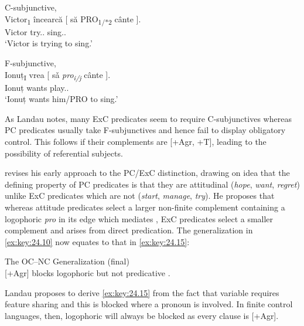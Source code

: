 \documentclass[output=paper]{langsci/langscibook}
\begin{document}
\ea\label{ex:key:24.13} C-subjunctive,  \parencite[6]{Alboiu2007}\\
	\gll Victor\textsubscript{1}  încearcă   [ să          PRO\textsubscript{1/*2} cânte ].\\
        Victor    try.\Prs.\Tsg{} {} \Sbjv{} {}    sing.\Sbjv.\Tsg{}\\
	\glt ‘Victor is trying to sing.’
\z

\ea\label{ex:key:24.14} F-subjunctive, \\
	\gll Ionuț\textsubscript{I} vrea  [ sǎ     \emph{pro\textsubscript{i/j}}\textsubscript{}  cânte ].\\
            Ionuț    wants {}  \Sbjv{} {} play.\Sbjv{}.\Tsg{}\\
	\glt ‘Ionuț wants him/PRO to sing.’
\z

As Landau notes, many \gls{ExC} predicates seem
to require C-subjunctives whereas \gls{PC}
predicates usually take F-subjunctives and hence fail to display obligatory
control. This follows if their complements are [+Agr, +T], leading to the
possibility of referential subjects.

\citet{Landau2015} revises his early approach to the \gls{PC}/\gls{ExC}
distinction, drawing on  idea that the defining property
of \gls{PC} predicates is that they are attitudinal
(\emph{hope}, \emph{want}, \emph{regret}) unlike
\gls{ExC} predicates which are not
(\emph{start}, \emph{manage}, \emph{try}). He proposes that whereas attitude
predicates select a larger non-finite complement containing a logophoric
\emph{pro} in its edge which mediates , \gls{ExC} predicates select a smaller complement and  arises from direct
predication. The generalization in \eqref{ex:key:24.10} now equates to that in
\eqref{ex:key:24.15}:

\ea\label{ex:key:24.15} The \gls{OC}--NC Generalization (final)\\
    {}[+Agr] blocks logophoric  but not predicative .
\z

Landau proposes to derive \eqref{ex:key:24.15} from the fact that variable  requires
feature sharing and this is blocked where a pronoun is involved. In finite
control languages, then, logophoric  will always be blocked as every
clause is [+Agr].
\end{document}
